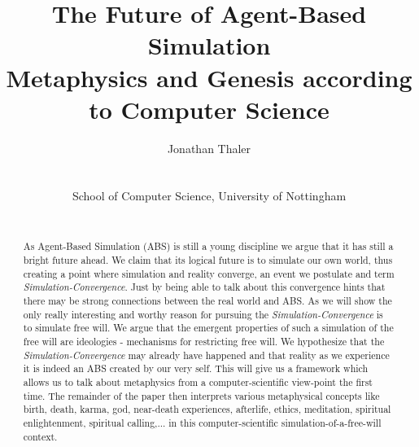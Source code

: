 \documentclass[a4paper, 10pt, conference]{../../templates/IEEEconf/IEEEconf}
\title{The Future of Agent-Based Simulation \\ Metaphysics and Genesis according to Computer Science}
\author{
	Jonathan Thaler \\
	\email{jonathan.thaler@nottingham.ac.uk} \\
	\begin{affiliation}
		School of Computer Science, University of Nottingham
	\end{affiliation} \\
}
\begin{document}
\maketitle

\begin{abstract}
As Agent-Based Simulation (ABS) is still a young discipline we argue that it has still a bright future ahead. We claim that its logical future is to simulate our own world, thus creating a point where simulation and reality converge, an event we postulate and term \textit{Simulation-Convergence}. Just by being able to talk about this convergence hints that there may be strong connections between the real world and ABS. As we will show the only really interesting and worthy reason for pursuing the \textit{Simulation-Convergence} is to simulate free will. We argue that the emergent properties of such a simulation of the free will are ideologies - mechanisms for restricting free will. We hypothesize that the \textit{Simulation-Convergence} may already have happened and that reality as we experience it is indeed an ABS created by our very self. This will give us a framework which allows us to talk about metaphysics from a computer-scientific view-point the first time. The remainder of the paper then interprets various metaphysical concepts like birth, death, karma, god, near-death experiences, afterlife, ethics, meditation, spiritual enlightenment, spiritual calling,... in this computer-scientific simulation-of-a-free-will context.
\end{abstract}















\end{document}
